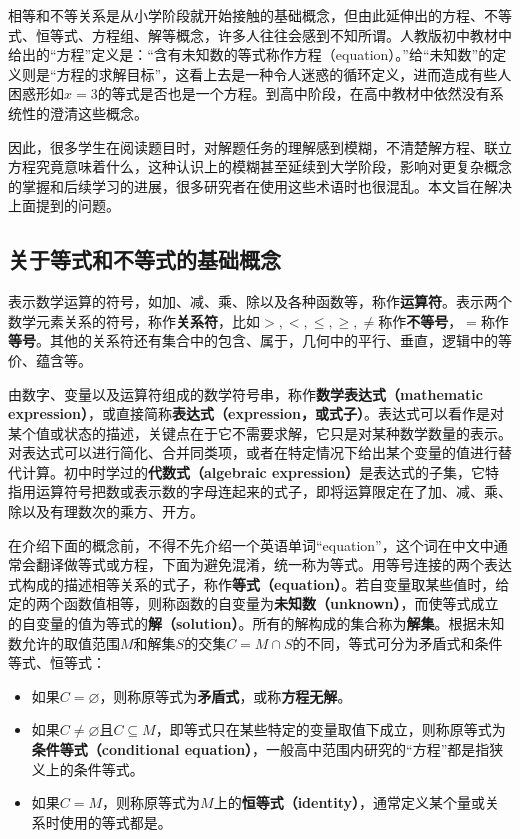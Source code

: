 
\begin{issues}
\issueDraft
\end{issues}


相等和不等关系是从小学阶段就开始接触的基础概念，但由此延伸出的方程、不等式、恒等式、方程组、解等概念，许多人往往会感到不知所谓。人教版初中教材中给出的“方程”定义是：“含有未知数的等式称作方程（equation）。”给“未知数”的定义则是“方程的求解目标”，这看上去是一种令人迷惑的循环定义，进而造成有些人困惑形如$x=3$的等式是否也是一个方程。到高中阶段，在高中教材中依然没有系统性的澄清这些概念。

因此，很多学生在阅读题目时，对解题任务的理解感到模糊，不清楚解方程、联立方程究竟意味着什么，这种认识上的模糊甚至延续到大学阶段，影响对更复杂概念的掌握和后续学习的进展，很多研究者在使用这些术语时也很混乱。本文旨在解决上面提到的问题。

\subsection{关于等式和不等式的基础概念}

表示数学运算的符号，如加、减、乘、除以及各种函数等，称作\textbf{运算符}。表示两个数学元素关系的符号，称作\textbf{关系符}，比如$>,<,\leq,\geq,\neq$称作\textbf{不等号}，$=$称作\textbf{等号}。其他的关系符还有集合中的包含、属于，几何中的平行、垂直，逻辑中的等价、蕴含等。

由数字、变量以及运算符组成的数学符号串，称作\textbf{数学表达式（mathematic expression）}，或直接简称\textbf{表达式（expression，或式子）}。表达式可以看作是对某个值或状态的描述，关键点在于它不需要求解，它只是对某种数学数量的表示。对表达式可以进行简化、合并同类项，或者在特定情况下给出某个变量的值进行替代计算。初中时学过的\textbf{代数式（algebraic expression）}是表达式的子集，它特指用运算符号把数或表示数的字母连起来的式子，即将运算限定在了加、减、乘、除以及有理数次的乘方、开方。

在介绍下面的概念前，不得不先介绍一个英语单词“equation”，这个词在中文中通常会翻译做等式或方程，下面为避免混淆，统一称为等式。用等号连接的两个表达式构成的描述相等关系的式子，称作\textbf{等式（equation）}。若自变量取某些值时，给定的两个函数值相等，则称函数的自变量为\textbf{未知数（unknown）}，而使等式成立的自变量的值为等式的\textbf{解（solution）}。所有的解构成的集合称为\textbf{解集}。根据未知数允许的取值范围$M$和解集$S$的交集$C=M\cap S$的不同，等式可分为矛盾式和条件等式、恒等式：
\begin{itemize}
\item 如果$C=\varnothing$，则称原等式为\textbf{矛盾式}，或称\textbf{方程无解}。
\item 如果$C\neq\varnothing$且$C\subseteq M$，即等式只在某些特定的变量取值下成立，则称原等式为\textbf{条件等式（conditional equation）}，一般高中范围内研究的“方程”都是指狭义上的条件等式。
\item 如果$C=M$，则称原等式为$M$上的\textbf{恒等式（identity）}，通常定义某个量或关系时使用的等式都是。
\end{itemize}

